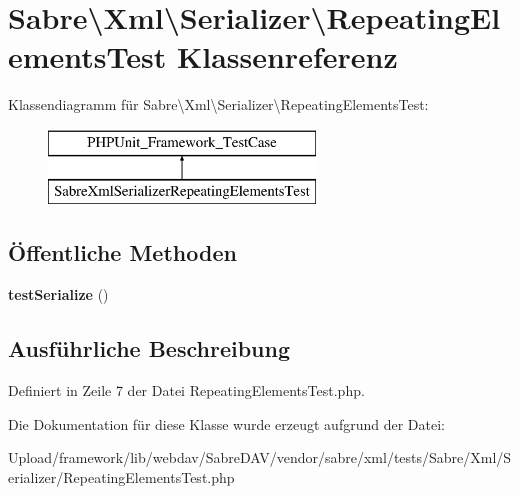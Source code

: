 \hypertarget{class_sabre_1_1_xml_1_1_serializer_1_1_repeating_elements_test}{}\section{Sabre\textbackslash{}Xml\textbackslash{}Serializer\textbackslash{}Repeating\+Elements\+Test Klassenreferenz}
\label{class_sabre_1_1_xml_1_1_serializer_1_1_repeating_elements_test}
Klassendiagramm für Sabre\textbackslash{}Xml\textbackslash{}Serializer\textbackslash{}Repeating\+Elements\+Test\+:\begin{figure}[H]
\begin{center}
\leavevmode
\includegraphics[height=2.000000cm]{class_sabre_1_1_xml_1_1_serializer_1_1_repeating_elements_test}
\end{center}
\end{figure}
\subsection*{Öffentliche Methoden}
\begin{DoxyCompactItemize}
\item 
\mbox{\label{class_sabre_1_1_xml_1_1_serializer_1_1_repeating_elements_test_a928138f1c1f10f58305e42d1e97b8725}} 
{\bfseries test\+Serialize} ()
\end{DoxyCompactItemize}


\subsection{Ausführliche Beschreibung}


Definiert in Zeile 7 der Datei Repeating\+Elements\+Test.\+php.



Die Dokumentation für diese Klasse wurde erzeugt aufgrund der Datei\+:\begin{DoxyCompactItemize}
\item 
Upload/framework/lib/webdav/\+Sabre\+D\+A\+V/vendor/sabre/xml/tests/\+Sabre/\+Xml/\+Serializer/Repeating\+Elements\+Test.\+php\end{DoxyCompactItemize}
